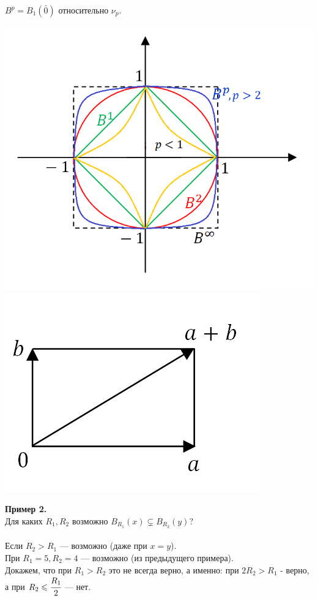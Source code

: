 \documentclass[12pt]{article}
\theoremstyle{definition}
\numberwithin{equation}{section}
\begin{document}
	$B^p = B_1(\bar 0)$ относительно $\nu_p$.\begin{center}
		\includegraphics[scale=0.7]{l4_11.png}
		\includegraphics[scale=0.5]{l4_12.png}
	\end{center}
	\textbf{Пример 2.}\\
	Для каких $R_1, R_2$ возможно $B_{R_1}(x) \subsetneq B_{R_2}(y)$?\\
	\\
	Если $R_2 > R_1$ --- возможно (даже при $x = y$).\\
	При $R_1 = 5, R_2 = 4$ --- возможно (из предыдущего примера).\\
	Докажем, что при $R_1 > R_2$ это не всегда верно, а именно: при $2R_2 > R_1$ - верно, а при $R_2 \leqslant \cfrac{R_1}{2}$ --- нет.\\
\end{document}
